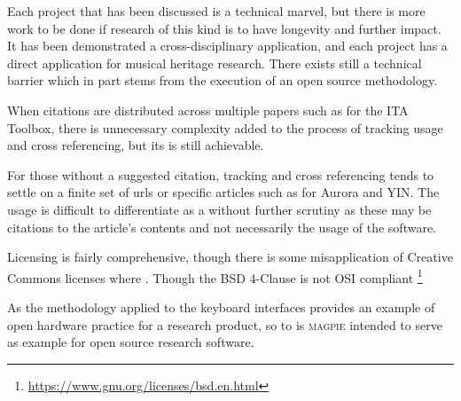 Each project that has been discussed is a technical marvel, but there is more work to be done if research of this kind is to have longevity and further impact.
It has been demonstrated a cross-disciplinary application, and each project has a direct application for musical heritage research. There exists still a technical barrier which in part stems from the execution of an open source methodology.

When citations are distributed across multiple papers such as for the ITA Toolbox, there is unnecessary complexity added to the process of tracking usage and cross referencing, but its is still achievable.

For those without a suggested citation, tracking and cross referencing tends to settle on a finite set of urls or specific articles such as for Aurora and YIN. The usage is difficult to differentiate as a without further scrutiny as these may be citations to the article's contents and not necessarily the usage of the software.

Licensing is fairly comprehensive, though there is some misapplication of Creative Commons licenses where \cite{cc_can_2025,hong_choosing_2025}. Though the BSD 4-Clause is not OSI compliant 
\footnote{\url{https://www.gnu.org/licenses/bsd.en.html}}


As the methodology applied to the keyboard interfaces provides an example of open hardware practice for a research product, so to is \textsc{magpie} intended to serve as example for open source research software.






